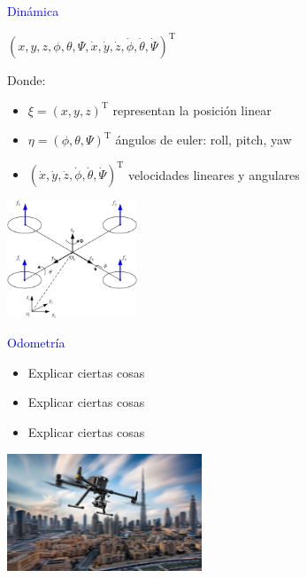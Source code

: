 \documentclass[
  24pt, %
  aspectratio=169, %
]{beamer}
\begin{document}
\begin{frame}%
  \begin{figure}[ht!]
    \centering
    \begin{minipage}{0.48\textwidth}
      \textcolor{blue}{Dinámica}\\
      {\scriptsize
      
      $(x,y,z,\phi,\theta,\Psi,\dot{x},\dot{y},\dot{z},\dot{\phi},\dot{\theta},\dot{\Psi})^\mathrm{T}$
      
      \bigskip %
      
      Donde:
      \begin{itemize}
      \item $\xi = (x,y,z)^\mathrm{T}$ representan la posición linear
      \item $\eta = (\phi,\theta,\Psi)^\mathrm{T}$ ángulos de euler: roll, pitch, yaw
      \item $(\dot{x},\dot{y},\dot{z},\dot{\phi},\dot{\theta},\dot{\Psi})^\mathrm{T}$ velocidades lineares y angulares
      \end{itemize}
      }
    \end{minipage}\hfill
    \begin{minipage}{0.48\textwidth}
      \centering
      \includegraphics[width=0.5\linewidth,height=3.5cm]{uav_model.jpeg} %
    \end{minipage}
    \vspace{-0.2cm} %
    \begin{minipage}{0.48\textwidth}
      \textcolor{blue}{Odometría}\\
      {\scriptsize
      \begin{itemize}
      \item Explicar ciertas cosas
      \item Explicar ciertas cosas
      \item Explicar ciertas cosas
      \end{itemize}
      }
    \end{minipage}\hfill
    \begin{minipage}{0.48\textwidth}
      \centering
      \includegraphics[width=\linewidth,height=3.5cm]{drone_city.jpg} %
    \end{minipage}
  \end{figure}
\end{frame}
\end{document}
